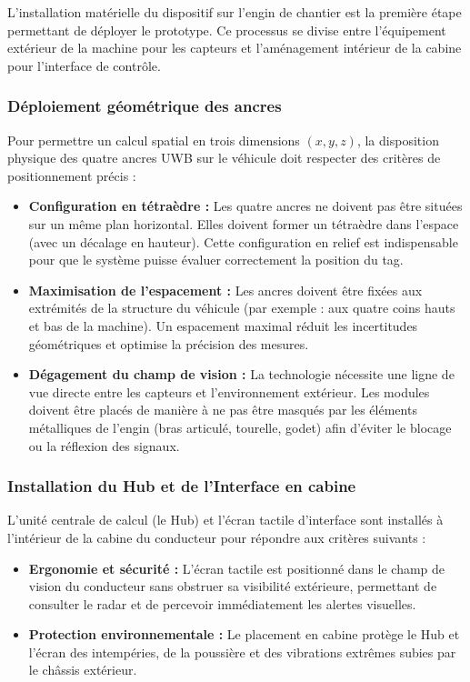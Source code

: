 L'installation matérielle du dispositif sur l'engin de chantier est la première étape permettant de déployer le prototype. Ce processus se divise entre l'équipement extérieur de la machine pour les capteurs et l'aménagement intérieur de la cabine pour l'interface de contrôle.

\subsubsection{Déploiement géométrique des ancres}

Pour permettre un calcul spatial en trois dimensions $(x, y, z)$, la disposition physique des quatre ancres UWB sur le véhicule doit respecter des critères de positionnement précis :

\begin{itemize}
    \item \textbf{Configuration en tétraèdre :} Les quatre ancres ne doivent pas être situées sur un même plan horizontal. Elles doivent former un tétraèdre dans l'espace (avec un décalage en hauteur). Cette configuration en relief est indispensable pour que le système puisse évaluer correctement la position du tag.
    \item \textbf{Maximisation de l'espacement :} Les ancres doivent être fixées aux extrémités de la structure du véhicule (par exemple : aux quatre coins hauts et bas de la machine). Un espacement maximal réduit les incertitudes géométriques et optimise la précision des mesures.
    \item \textbf{Dégagement du champ de vision :} La technologie nécessite une ligne de vue directe entre les capteurs et l'environnement extérieur. Les modules doivent être placés de manière à ne pas être masqués par les éléments métalliques de l'engin (bras articulé, tourelle, godet) afin d'éviter le blocage ou la réflexion des signaux.
\end{itemize}

\subsubsection{Installation du Hub et de l'Interface en cabine}

L'unité centrale de calcul (le Hub) et l'écran tactile d'interface sont installés à l'intérieur de la cabine du conducteur pour répondre aux critères suivants :

\begin{itemize}
    \item \textbf{Ergonomie et sécurité :} L'écran tactile est positionné dans le champ de vision du conducteur sans obstruer sa visibilité extérieure, permettant de consulter le radar et de percevoir immédiatement les alertes visuelles.
    \item \textbf{Protection environnementale :} Le placement en cabine protège le Hub et l'écran des intempéries, de la poussière et des vibrations extrêmes subies par le châssis extérieur.
\end{itemize}

